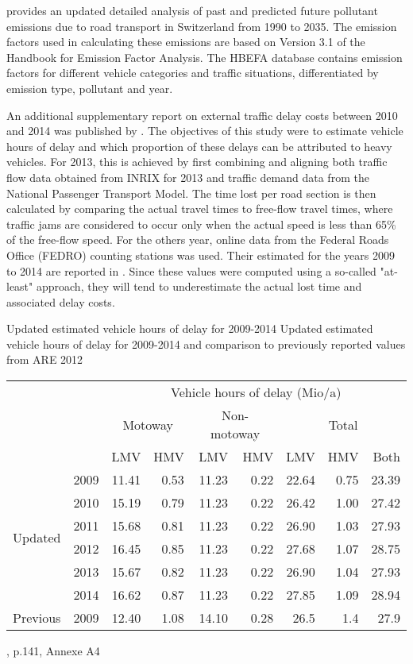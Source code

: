 \cite{foen2010pollutants} provides an updated detailed analysis of past and predicted future pollutant emissions due to road transport in Switzerland from 1990 to 2035.
The emission factors used in calculating these emissions are based on Version 3.1 of the Handbook for Emission Factor Analysis.
The HBEFA database contains emission factors for different vehicle categories and traffic situations, differentiated by emission type, pollutant and year.

An additional supplementary report on external traffic delay costs between 2010 and 2014 was published by \cite{mkinfras2016staukosten}.
The objectives of this study were to estimate vehicle hours of delay and which proportion of these delays can be attributed to heavy vehicles.
For 2013, this is achieved by first combining and aligning both traffic flow data obtained from INRIX for 2013 and traffic demand data from the National Passenger Transport Model.
The time lost per road section is then calculated by comparing the actual travel times to free-flow travel times, where traffic jams are considered to occur only when the actual speed is less than 65\% of the free-flow speed.
For the others year, online data from the Federal Roads Office (FEDRO) counting stations was used.
Their estimated for the years 2009 to 2014 are reported in .
Since these values were computed using a so-called "at-least" approach, they will tend to underestimate the actual lost time and associated delay costs.

\createtable%
{Updated estimated vehicle hours of delay for 2009-2014}%
{Updated estimated vehicle hours of delay for 2009-2014 and comparison to previously reported values from ARE 2012}%
{\label{tab:vehHoursDelayMkInfras}}%
{%
  \begin{tabular}[c]{lrrrrrrrr}
    \toprule
    \multirow{3}{*}{} & & \multicolumn{7}{c}{Vehicle hours of delay (Mio/a)}\\ 
    & & \multicolumn{2}{c}{Motoway} & \multicolumn{2}{c}{Non-motoway} & \multicolumn{3}{c}{Total}\\
    & &  LMV & HMV & LMV & HMV & LMV & HMV & Both\\
    \midrule
    \multirow{6}{*}{Updated}
    & 2009 & 11.41 & 0.53 & 11.23 & 0.22 & 22.64 & 0.75 & 23.39 \\
	& 2010 & 15.19 & 0.79 & 11.23 & 0.22 & 26.42 & 1.00 & 27.42 \\
	& 2011 & 15.68 & 0.81 & 11.23 & 0.22 & 26.90 & 1.03 & 27.93 \\
	& 2012 & 16.45 & 0.85 & 11.23 & 0.22 & 27.68 & 1.07 & 28.75 \\
	& 2013 & 15.67 & 0.82 & 11.23 & 0.22 & 26.90 & 1.04 & 27.93 \\
	& 2014 & 16.62 & 0.87 & 11.23 & 0.22 & 27.85 & 1.09 & 28.94 \\
	\midrule
	Previous & 2009 & 12.40 & 1.08 & 14.10 & 0.28 & 26.5 & 1.4 & 27.9 \\
    \bottomrule
  \end{tabular}
}%
{\cite{mkinfras2016staukosten}, p.141, Annexe A4}


